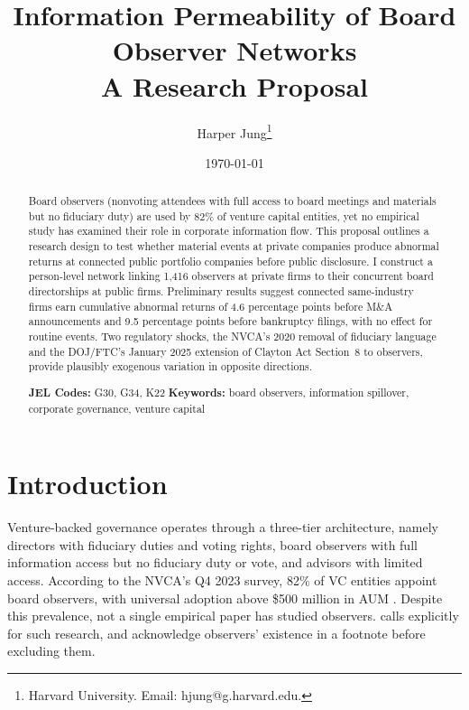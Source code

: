 \documentclass[12pt]{article}
\title{Information Permeability of Board Observer Networks\\A Research Proposal}
\author{
Harper Jung\thanks{Harvard University. Email: hjung@g.harvard.edu.}
}
\date{\today}
\begin{document}
\maketitle
\thispagestyle{empty}

\begin{abstract}
\noindent
Board observers (nonvoting attendees with full access to board meetings and materials but no fiduciary duty) are used by 82\% of venture capital entities, yet no empirical study has examined their role in corporate information flow. This proposal outlines a research design to test whether material events at private companies produce abnormal returns at connected public portfolio companies before public disclosure. I construct a person-level network linking 1,416 observers at private firms to their concurrent board directorships at public firms. Preliminary results suggest connected same-industry firms earn cumulative abnormal returns of 4.6 percentage points before M\&A announcements and 9.5 percentage points before bankruptcy filings, with no effect for routine events. Two regulatory shocks, the NVCA's 2020 removal of fiduciary language and the DOJ/FTC's January 2025 extension of Clayton Act Section~8 to observers, provide plausibly exogenous variation in opposite directions.

\medskip
\noindent \textbf{JEL Codes:} G30, G34, K22 \quad \textbf{Keywords:} board observers, information spillover, corporate governance, venture capital
\end{abstract}

\newpage
\setcounter{page}{1}

\section{Introduction}
\label{sec:intro}

Venture-backed governance operates through a three-tier architecture, namely directors with fiduciary duties and voting rights, board observers with full information access but no fiduciary duty or vote, and advisors with limited access. According to the NVCA's Q4 2023 survey, 82\% of VC entities appoint board observers, with universal adoption above \$500 million in AUM \cite{packin2025board}. Despite this prevalence, not a single empirical paper has studied observers.  calls explicitly for such research, and  acknowledge observers' existence in a footnote before excluding them.
\end{document}

